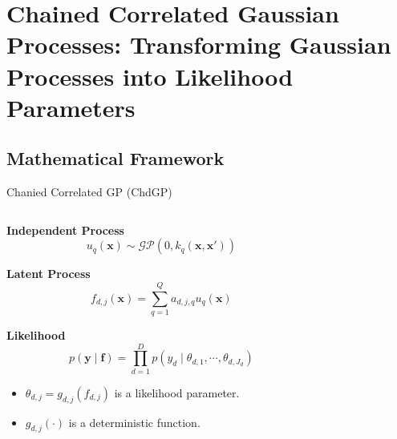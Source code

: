 \section[Chained Correlated Gaussian Processes]{Chained Correlated Gaussian Processes: Transforming Gaussian Processes into Likelihood Parameters}

\subsection{Mathematical Framework}


\begin{frame}{Chanied Correlated GP (ChdGP)}
	
	\begin{columns}[T] %
		\begin{column}{0.5\textwidth}	
			\textbf{Independent Process}
			\begin{equation*}
				u_{q}(\mathbf{x}) \sim \mathcal{GP}(0, k_{q}(\mathbf{x}, \mathbf{x}'))
			\end{equation*}
			
			\textbf{Latent Process}
			\begin{equation*}
					f_{d,j}(\mathbf{x}) = \sum_{q=1}^Q a_{d,j,q} u_{q}(\mathbf{x})
			\end{equation*}
			
			\textbf{Likelihood}
			\begin{equation*}
				p(\mathbf{y} \mid \mathbf{f}) = \prod_{d=1}^D p(y_{d}\mid \theta_{d, 1}, \cdots, \theta_{d, J_d})
			\end{equation*}
			
	
				\begin{itemize}
					\item $\theta_{d,j} = g_{d, j}(f_{d, j})$ is a likelihood parameter. 
					\item  $g_{d, j}(\cdot)$ is a deterministic function.
				\end{itemize}
	
			
		\end{column}
		
		\begin{column}{0.5\textwidth}
			\justifying
			\setlength{} 
			\setlength{}
				
		\end{column}
		
	\end{columns}
\end{frame}

